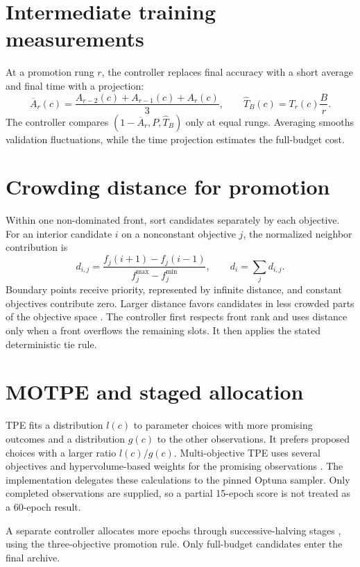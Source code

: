 \documentclass[11pt,a4paper,oneside]{report}
\begin{document}
\section{Intermediate training measurements}
At a promotion rung $r$, the controller replaces final accuracy with a short average and final time with a projection:
\begin{equation}
 \overline{A}_r(c)=\frac{A_{r-2}(c)+A_{r-1}(c)+A_r(c)}{3},
 \qquad \widehat{T}_B(c)=T_r(c)\frac{B}{r}.
\end{equation}
The controller compares $(1-\overline{A}_r,P,\widehat{T}_B)$ only at equal rungs. Averaging smooths validation fluctuations, while the time projection estimates the full-budget cost.

\section{Crowding distance for promotion}
Within one non-dominated front, sort candidates separately by each objective. For an interior candidate $i$ on a nonconstant objective $j$, the normalized neighbor contribution is
\begin{equation}
 d_{i,j}=\frac{f_j(i+1)-f_j(i-1)}{f_j^{\max}-f_j^{\min}},
 \qquad d_i=\sum_j d_{i,j}.
\end{equation}
Boundary points receive priority, represented by infinite distance, and constant objectives contribute zero. Larger distance favors candidates in less crowded parts of the objective space \cite{nsga}. The controller first respects front rank and uses distance only when a front overflows the remaining slots. It then applies the stated deterministic tie rule.

\section{MOTPE and staged allocation}
TPE fits a distribution $l(c)$ to parameter choices with more promising outcomes and a distribution $g(c)$ to the other observations. It prefers proposed choices with a larger ratio $l(c)/g(c)$. Multi-objective TPE uses several objectives and hypervolume-based weights for the promising observations \cite{optuna}. The implementation delegates these calculations to the pinned Optuna sampler. Only completed observations are supplied, so a partial 15-epoch score is not treated as a 60-epoch result.

A separate controller allocates more epochs through successive-halving stages \cite{halving}, using the three-objective promotion rule. Only full-budget candidates enter the final archive.
\end{document}

